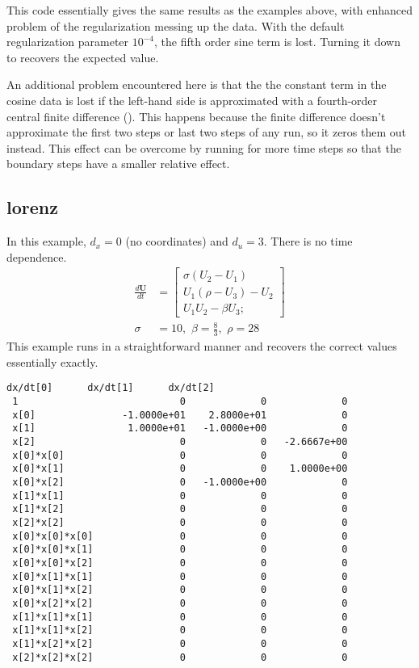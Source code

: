 \documentclass{article}
\let\vec\mathbf
\def\lstinline#1{}%
\begin{document}
This code essentially gives the same results as the examples above, with
enhanced problem of the regularization messing up the data. With the default
regularization parameter $10^{-4}$, the fifth order sine term is lost. Turning
it down to \lstinline{-tao_brgn_regularizer_weight 1e-7} recovers the expected
value.

An additional problem encountered here is that the the constant term in the
cosine data is lost if the left-hand side is approximated with a fourth-order
central finite difference (\lstinline{-fd_der 1}). This happens because the
finite difference doesn't approximate the first two steps or last two steps of
any run, so it zeros them out instead. This effect can be overcome by running
for more time steps so that the boundary steps have a smaller relative effect.


\subsection{lorenz}
In this example, $d_x = 0$ (no coordinates) and $d_u = 3$. There is no time dependence.
\begin{align*}
\frac{d\vec{U}}{dt} &=
\begin{bmatrix}
\sigma(U_2-U_1) \\
U_1(\rho-U_3)-U_2 \\
U_1U_2-\beta U_3;
\end{bmatrix} \\
\sigma &= 10,\,\, \beta = \frac{8}{3},\,\, \rho = 28
\end{align*}
This example runs in a straightforward manner and recovers the correct values
essentially exactly.
\begin{lstlisting}[language={}]
                      dx/dt[0]      dx/dt[1]      dx/dt[2]
 1                            0             0             0
 x[0]               -1.0000e+01    2.8000e+01             0
 x[1]                1.0000e+01   -1.0000e+00             0
 x[2]                         0             0   -2.6667e+00
 x[0]*x[0]                    0             0             0
 x[0]*x[1]                    0             0    1.0000e+00
 x[0]*x[2]                    0   -1.0000e+00             0
 x[1]*x[1]                    0             0             0
 x[1]*x[2]                    0             0             0
 x[2]*x[2]                    0             0             0
 x[0]*x[0]*x[0]               0             0             0
 x[0]*x[0]*x[1]               0             0             0
 x[0]*x[0]*x[2]               0             0             0
 x[0]*x[1]*x[1]               0             0             0
 x[0]*x[1]*x[2]               0             0             0
 x[0]*x[2]*x[2]               0             0             0
 x[1]*x[1]*x[1]               0             0             0
 x[1]*x[1]*x[2]               0             0             0
 x[1]*x[2]*x[2]               0             0             0
 x[2]*x[2]*x[2]               0             0             0
\end{lstlisting}
\end{document}
